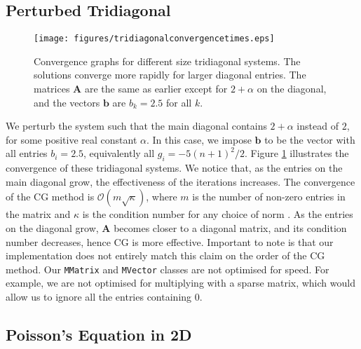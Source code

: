 \documentclass{article}
\begin{document}
\subsection{Perturbed Tridiagonal}

\begin{figure}
	\centering
	\texttt{[image: figures/tridiagonalconvergencetimes.eps]}
	\caption{
		Convergence graphs for different size tridiagonal systems.
		The solutions converge more rapidly for larger diagonal entries.
		The matrices $\mathbf{A}$ are the same as earlier except for $2+\alpha$ on the diagonal,
		and the vectors $\mathbf{b}$ are $b_k = 2.5$ for all $k$.
	}
	\label{fig:tridiag}
\end{figure}
We perturb the system such that the main diagonal contains $2+\alpha$ instead of $2$,
for some positive real constant $\alpha$.
In this case, we impose $\mathbf{b}$ to be the vector with all entries $b_i = 2.5$,
equivalently all $g_i = -5(n+1)^2/2$.
Figure \ref{fig:tridiag} illustrates the convergence of these tridiagonal systems.
We notice that, as the entries on the main diagonal grow, the effectiveness of the iterations increases.
The convergence of the CG method is $\mathcal{O}(m\sqrt{\kappa})$,
where $m$ is the number of non-zero entries in the matrix and $\kappa$ is the condition number for any choice of norm \cite{shewchuk1994introduction2}.
As the entries on the diagonal grow, $\mathbf{A}$ becomes closer to a diagonal matrix, and its condition number decreases,
hence CG is more effective.
Important to note is that our implementation does not entirely match this claim on the order of the CG method.
Our \texttt{MMatrix} and \texttt{MVector} classes are not optimised for speed.
For example, we are not optimised for multiplying with a sparse matrix, which would allow us to ignore all the entries containing $0$.

\subsection{Poisson's Equation in 2D}
\end{document}
